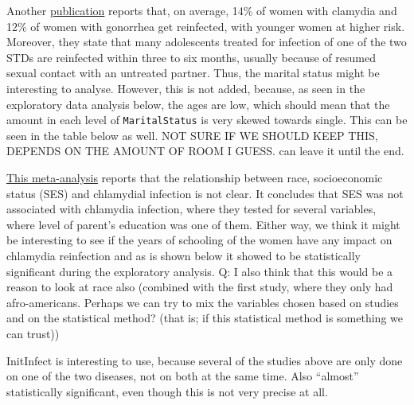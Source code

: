 \documentclass[
]{article}
\begin{document}
Another \href{https://policylab.chop.edu/sites/default/files/pdf/publications/Preventing_Chlamydia_Gonorrhea_Reinfection_through_Increased_Use_of_EPT.pdf}{publication} reports that, on average, 14\% of women with clamydia and 12\% of women with gonorrhea get reinfected, with younger women at higher risk. Moreover, they state that many adolescents treated for infection of one of the two STDs are reinfected within three to six months, usually because of resumed sexual contact with an untreated partner. Thus, the marital status might be interesting to analyse. However, this is not added, because, as seen in the exploratory data analysis below, the ages are low, which should mean that the amount in each level of \texttt{MaritalStatus} is very skewed towards single. This can be seen in the table below as well. NOT SURE IF WE SHOULD KEEP THIS, DEPENDS ON THE AMOUNT OF ROOM I GUESS. can leave it until the end.

\href{https://www.ncbi.nlm.nih.gov/pmc/articles/PMC2094865/}{This meta-analysis} reports that the relationship between race, socioeconomic status (SES) and chlamydial infection is not clear. It concludes that SES was not associated with chlamydia infection, where they tested for several variables, where level of parent's education was one of them. Either way, we think it might be interesting to see if the years of schooling of the women have any impact on chlamydia reinfection and as is shown below it showed to be statistically significant during the exploratory analysis. Q: I also think that this would be a reason to look at race also (combined with the first study, where they only had afro-americans. Perhaps we can try to mix the variables chosen based on studies and on the statistical method? (that is; if this statistical method is something we can trust))

InitInfect is interesting to use, because several of the studies above are only done on one of the two diseases, not on both at the same time. Also ``almost'' statistically significant, even though this is not very precise at all.
\end{document}
